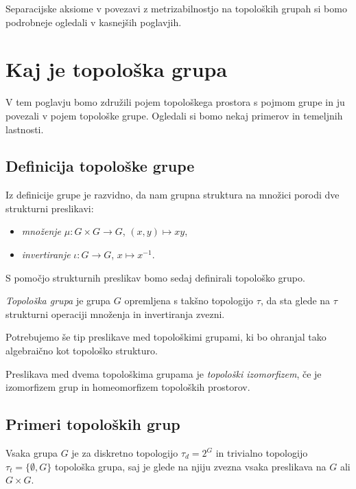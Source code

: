 \documentclass[mat1]{fmfdelo}
\begin{document}
Separacijske aksiome v povezavi z metrizabilnostjo na topoloških grupah si bomo podrobneje ogledali v kasnejših poglavjih.

\section{Kaj je topološka grupa}
V tem poglavju bomo združili pojem topološkega prostora s pojmom grupe in ju povezali v pojem topološke grupe. Ogledali si bomo nekaj primerov in temeljnih lastnosti.

\subsection{Definicija topološke grupe}
Iz definicije grupe je razvidno, da nam grupna struktura na množici porodi dve strukturni preslikavi:
\begin{itemize}
\item \emph{množenje} $\mu\colon G \times G \to G$, $(x, y) \mapsto xy$,
\item \emph{invertiranje} $\iota\colon G \to G$, $x \mapsto x^{-1}$.
\end{itemize}

S pomočjo strukturnih preslikav bomo sedaj definirali topološko grupo.
\begin{definicija}\label{def:topgrupa}
\emph{Topološka grupa} je grupa $G$ opremljena s takšno topologijo $\tau$, da sta glede na $\tau$ strukturni operaciji množenja in invertiranja zvezni. 
\end{definicija}

Potrebujemo še tip preslikave med topološkimi grupami, ki bo ohranjal tako algebraično kot topološko strukturo.
\begin{definicija}\label{def:topizo}
Preslikava med dvema topološkima grupama je \emph{to\-po\-loš\-ki izo\-mor\-fi\-zem}, če je izomorfizem grup in homeomorfizem topoloških prostorov.
\end{definicija}


\subsection{Primeri topoloških grup}

\begin{primer}
	Vsaka grupa $G$ je za diskretno topologijo $\tau_d = 2^G$ in trivialno topologijo $\tau_t = \lbrace \emptyset, G \rbrace$ topološka grupa, saj je glede na njiju zvezna vsaka preslikava na $G$ ali $G \times G$.
\end{primer}
\end{document}
